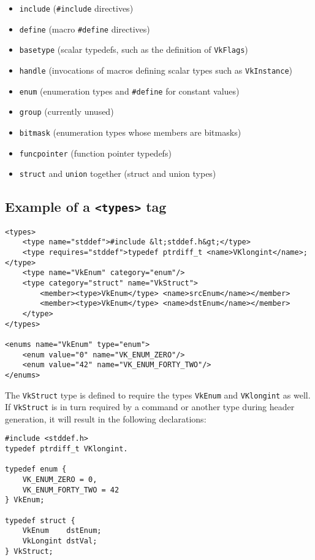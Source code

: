\documentclass{article}
\def\code#1{{\tt #1}}
\def\tag#1{{\tt <#1>\index{<#1>}}}
\begin{document}
\begin{itemize}
  \item \code{include} ({\tt \#include} directives)
  \item \code{define} (macro {\tt \#define} directives)
  \item \code{basetype} (scalar typedefs, such as the definition of
        {\tt VkFlags})
  \item \code{handle} (invocations of macros defining scalar types such as
        {\tt VkInstance})
  \item \code{enum} (enumeration types and {\tt \#define} for constant values)
  \item \code{group} (currently unused)
  \item \code{bitmask} (enumeration types whose members are bitmasks)
  \item \code{funcpointer} (function pointer typedefs)
  \item \code{struct} and \code{union} together (struct and union types)
\end{itemize}


\subsection{Example of a \tag{types} tag}
\label{tag:types:example}

\begin{verbatim}
<types>
    <type name="stddef">#include &lt;stddef.h&gt;</type>
    <type requires="stddef">typedef ptrdiff_t <name>VKlongint</name>;</type>
    <type name="VkEnum" category="enum"/>
    <type category="struct" name="VkStruct">
        <member><type>VkEnum</type> <name>srcEnum</name></member>
        <member><type>VkEnum</type> <name>dstEnum</name></member>
    </type>
</types>

<enums name="VkEnum" type="enum">
    <enum value="0" name="VK_ENUM_ZERO"/>
    <enum value="42" name="VK_ENUM_FORTY_TWO"/>
</enums>
\end{verbatim}

The {\tt VkStruct} type is defined to require the types {\tt VkEnum} and
{\tt VKlongint} as well. If {\tt VkStruct} is in turn required by a command
or another type during header generation, it will result in the following
declarations:

\begin{verbatim}
#include <stddef.h>
typedef ptrdiff_t VKlongint.

typedef enum {
    VK_ENUM_ZERO = 0,
    VK_ENUM_FORTY_TWO = 42
} VkEnum;

typedef struct {
    VkEnum    dstEnum;
    VkLongint dstVal;
} VkStruct;
\end{verbatim}
\end{document}
